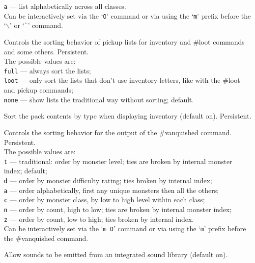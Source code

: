 {\tt a} --- list alphabetically across all classes.\\
Can be interactively set via the `{\tt O}' command or via using
the `{\tt m}' prefix before the `{\tt $\backslash$}'
or `{\tt \`{}}' command.
\item[\ib{sortloot}]
Controls the sorting behavior of pickup lists for inventory
and \#loot commands and some others.  Persistent.
\\
The possible values are:
\\
{\tt full} --- always sort the lists;\\
{\tt loot} --- only sort the lists that don't use inventory
       letters, like with the \#loot and pickup commands;\\
{\tt none} --- show lists the traditional way without sorting; default.
\item[\ib{sortpack}]
Sort the pack contents by type when displaying inventory (default on).
Persistent.
\item[\tb{sortvanquished}]
Controls the sorting behavior for the output of the \#vanquished command.
Persistent.
\\
The possible values are:
\\
{\tt t} ---
traditional: order by monster level; ties are broken by internal
monster index;
default;
\\
{\tt d} ---
order by monster difficulty rating; ties broken by internal index;
\\
{\tt a} ---
order alphabetically, first any unique monsters then all the others;
\\
{\tt c} ---
order by monster class, by low to high level within each class;
\\
{\tt n} ---
order by count, high to low; ties are broken by internal monster index;
\\
{\tt z} ---
order by count, low to high; ties broken by internal index.
\\
Can be interactively set via the `{\tt m O}' command or via using
the `{\tt m}' prefix before the \#vanquished command.
\item[\ib{sounds}]
Allow sounds to be emitted from an integrated sound library (default on).
